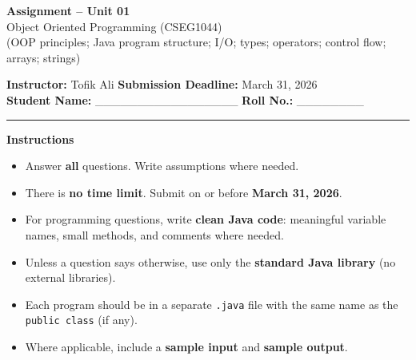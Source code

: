 \documentclass[11pt,a4paper]{article}
\begin{document}
\begin{center}
  {\LARGE \textbf{Assignment -- Unit 01}}\\[0.25em]
  {\large Object Oriented Programming (CSEG1044)}\\[0.25em]
  \normalsize (OOP principles; Java program structure; I/O; types; operators; control flow; arrays; strings)
\end{center}

\noindent
\textbf{Instructor:} Tofik Ali \hfill \textbf{Submission Deadline:} March 31, 2026\\
\textbf{Student Name:} \_\_\_\_\_\_\_\_\_\_\_\_\_\_\_\_\_ \hfill \textbf{Roll No.:} \_\_\_\_\_\_\_\_\\

\vspace{0.6em}
\hrule
\vspace{0.8em}

\textbf{Instructions}
\begin{itemize}[leftmargin=*]
  \item Answer \textbf{all} questions. Write assumptions where needed.
  \item There is \textbf{no time limit}. Submit on or before \textbf{March 31, 2026}.
  \item For programming questions, write \textbf{clean Java code}: meaningful variable names, small methods, and comments where needed.
  \item Unless a question says otherwise, use only the \textbf{standard Java library} (no external libraries).
  \item Each program should be in a separate \texttt{.java} file with the same name as the \texttt{public class} (if any).
  \item Where applicable, include a \textbf{sample input} and \textbf{sample output}.
\end{itemize}

\vspace{0.6em}
\end{document}
